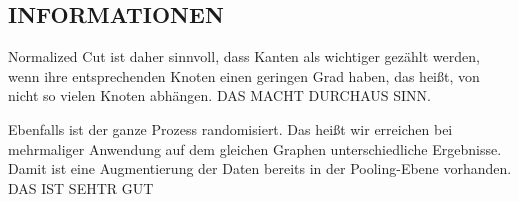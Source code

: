 \subsection{INFORMATIONEN}

Normalized Cut ist daher sinnvoll, dass Kanten als wichtiger gezählt werden, wenn ihre entsprechenden Knoten einen geringen Grad haben, das heißt, von nicht so vielen Knoten abhängen.
DAS MACHT DURCHAUS SINN.

Ebenfalls ist der ganze Prozess randomisiert.
Das heißt wir erreichen bei mehrmaliger Anwendung auf dem gleichen Graphen unterschiedliche Ergebnisse.
Damit ist eine Augmentierung der Daten bereits in der Pooling-Ebene vorhanden.
DAS IST SEHTR GUT
